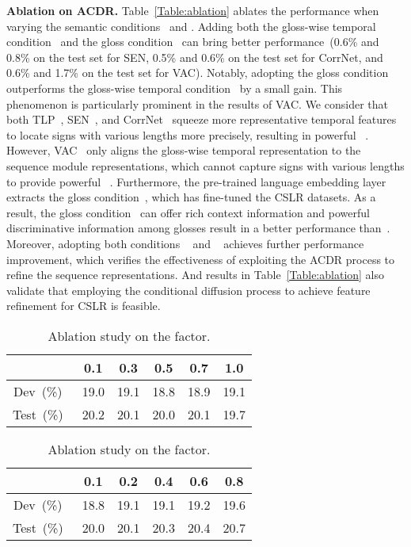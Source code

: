 \documentclass[sigconf]{acmart}
\begin{document}
\noindent \textbf{Ablation on ACDR.}  Table~\ref{Table:ablation} ablates the performance when varying the semantic conditions~ and .
Adding both the gloss-wise temporal condition~ and the gloss condition~ can bring better performance~(0.6\% and 0.8\% on the test set for SEN, 0.5\% and 0.6\% on the test set for CorrNet, 
and 0.6\% and 1.7\% on the test set for VAC).
Notably, adopting the gloss condition~ outperforms the gloss-wise temporal condition~ by a small gain.
This phenomenon is particularly prominent in the results of VAC.
We consider that both TLP~\cite{hu2022temporal}, SEN~\cite{Hu2022SelfEmphasizingNF}, and CorrNet~\cite{hu2023continuous} squeeze
more representative temporal features to locate signs with various lengths more precisely, resulting in powerful ~. 
However, VAC~\cite{min2021visual} only aligns the gloss-wise temporal representation to the sequence module representations, which cannot capture signs with various lengths to provide powerful ~.
Furthermore, the pre-trained language embedding layer extracts the gloss condition~, which has fine-tuned the CSLR datasets. 
As a result, the gloss condition~ can offer 
rich context information and powerful discriminative information among glosses result in a better performance than~.
Moreover, adopting both conditions ~ and ~ achieves further performance improvement, which verifies the effectiveness of exploiting the ACDR process to refine the sequence representations. 
And results in Table~\ref{Table:ablation} also validate that employing the conditional diffusion process to achieve feature refinement for CSLR is feasible.



\setlength{\tabcolsep}{5pt}
\begin{table}[!htbp]
\centering
\fontsize{9}{12}\selectfont
\caption{Ablation study on the  factor.}
\begin{tabular}{c|c|c|c|c|c} 
\toprule
 & 0.1 & 0.3 & 0.5 & 0.7 & 1.0 \\ \midrule Dev~(\%)~ & 19.0 & 19.1 & 18.8 & 18.9 & 19.1 \\ \midrule Test~(\%)~ & 20.2 & 20.1 & 20.0 & 20.1 & 19.7 \\  \bottomrule
    \end{tabular}
    \label{Table:gamma1}
\end{table}

\setlength{\tabcolsep}{5pt}
\begin{table}[!htbp]
\centering
\fontsize{9}{12}\selectfont
\caption{Ablation study on the  factor.}
\begin{tabular}{c|c|c|c|c|c} 
\toprule
 & 0.1 & 0.2 & 0.4 & 0.6 & 0.8 \\ \midrule Dev~(\%)~ & 18.8 & 19.1 & 19.1 & 19.2 & 19.6 \\ \midrule Test~(\%)~ & 20.0 & 20.1 & 20.3 & 20.4 & 20.7 \\  \bottomrule
    \end{tabular}
    \label{Table:gamma2}
\end{table}
\end{document}
